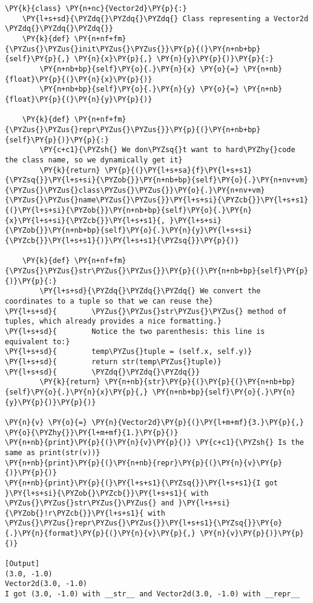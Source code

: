 \begin{Verbatim}[label=\makebox{\url{https://github.com/lucabaldini/cmepda/tree/master/slides/latex/snippets/vector2d\_printable.py}},commandchars=\\\{\}]
\PY{k}{class} \PY{n+nc}{Vector2d}\PY{p}{:}
    \PY{l+s+sd}{\PYZdq{}\PYZdq{}\PYZdq{} Class representing a Vector2d \PYZdq{}\PYZdq{}\PYZdq{}}
    \PY{k}{def} \PY{n+nf+fm}{\PYZus{}\PYZus{}init\PYZus{}\PYZus{}}\PY{p}{(}\PY{n+nb+bp}{self}\PY{p}{,} \PY{n}{x}\PY{p}{,} \PY{n}{y}\PY{p}{)}\PY{p}{:}
        \PY{n+nb+bp}{self}\PY{o}{.}\PY{n}{x} \PY{o}{=} \PY{n+nb}{float}\PY{p}{(}\PY{n}{x}\PY{p}{)}
        \PY{n+nb+bp}{self}\PY{o}{.}\PY{n}{y} \PY{o}{=} \PY{n+nb}{float}\PY{p}{(}\PY{n}{y}\PY{p}{)}

    \PY{k}{def} \PY{n+nf+fm}{\PYZus{}\PYZus{}repr\PYZus{}\PYZus{}}\PY{p}{(}\PY{n+nb+bp}{self}\PY{p}{)}\PY{p}{:}
        \PY{c+c1}{\PYZsh{} We don\PYZsq{}t want to hard\PYZhy{}code the class name, so we dynamically get it}
        \PY{k}{return} \PY{p}{(}\PY{l+s+sa}{f}\PY{l+s+s1}{\PYZsq{}}\PY{l+s+si}{\PYZob{}}\PY{n+nb+bp}{self}\PY{o}{.}\PY{n+nv+vm}{\PYZus{}\PYZus{}class\PYZus{}\PYZus{}}\PY{o}{.}\PY{n+nv+vm}{\PYZus{}\PYZus{}name\PYZus{}\PYZus{}}\PY{l+s+si}{\PYZcb{}}\PY{l+s+s1}{(}\PY{l+s+si}{\PYZob{}}\PY{n+nb+bp}{self}\PY{o}{.}\PY{n}{x}\PY{l+s+si}{\PYZcb{}}\PY{l+s+s1}{, }\PY{l+s+si}{\PYZob{}}\PY{n+nb+bp}{self}\PY{o}{.}\PY{n}{y}\PY{l+s+si}{\PYZcb{}}\PY{l+s+s1}{)}\PY{l+s+s1}{\PYZsq{}}\PY{p}{)}

    \PY{k}{def} \PY{n+nf+fm}{\PYZus{}\PYZus{}str\PYZus{}\PYZus{}}\PY{p}{(}\PY{n+nb+bp}{self}\PY{p}{)}\PY{p}{:}
        \PY{l+s+sd}{\PYZdq{}\PYZdq{}\PYZdq{} We convert the coordinates to a tuple so that we can reuse the}
\PY{l+s+sd}{        \PYZus{}\PYZus{}str\PYZus{}\PYZus{} method of tuples, which already provides a nice formatting.}
\PY{l+s+sd}{        Notice the two parenthesis: this line is equivalent to:}
\PY{l+s+sd}{        temp\PYZus{}tuple = (self.x, self.y)}
\PY{l+s+sd}{        return str(temp\PYZus{}tuple)}
\PY{l+s+sd}{        \PYZdq{}\PYZdq{}\PYZdq{}}
        \PY{k}{return} \PY{n+nb}{str}\PY{p}{(}\PY{p}{(}\PY{n+nb+bp}{self}\PY{o}{.}\PY{n}{x}\PY{p}{,} \PY{n+nb+bp}{self}\PY{o}{.}\PY{n}{y}\PY{p}{)}\PY{p}{)}

\PY{n}{v} \PY{o}{=} \PY{n}{Vector2d}\PY{p}{(}\PY{l+m+mf}{3.}\PY{p}{,} \PY{o}{\PYZhy{}}\PY{l+m+mf}{1.}\PY{p}{)}
\PY{n+nb}{print}\PY{p}{(}\PY{n}{v}\PY{p}{)} \PY{c+c1}{\PYZsh{} Is the same as print(str(v))}
\PY{n+nb}{print}\PY{p}{(}\PY{n+nb}{repr}\PY{p}{(}\PY{n}{v}\PY{p}{)}\PY{p}{)}
\PY{n+nb}{print}\PY{p}{(}\PY{l+s+s1}{\PYZsq{}}\PY{l+s+s1}{I got }\PY{l+s+si}{\PYZob{}\PYZcb{}}\PY{l+s+s1}{ with \PYZus{}\PYZus{}str\PYZus{}\PYZus{} and }\PY{l+s+si}{\PYZob{}!r\PYZcb{}}\PY{l+s+s1}{ with \PYZus{}\PYZus{}repr\PYZus{}\PYZus{}}\PY{l+s+s1}{\PYZsq{}}\PY{o}{.}\PY{n}{format}\PY{p}{(}\PY{n}{v}\PY{p}{,} \PY{n}{v}\PY{p}{)}\PY{p}{)}

[Output]
(3.0, -1.0)
Vector2d(3.0, -1.0)
I got (3.0, -1.0) with __str__ and Vector2d(3.0, -1.0) with __repr__
\end{Verbatim}